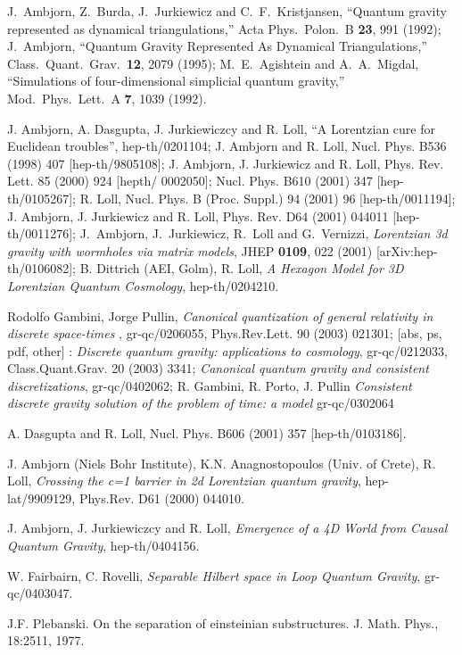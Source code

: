 \documentclass[12pt]{article}
\begin{document}
\begin{thebibliography}{0}
{J.~Ambjorn, Z.~Burda, J.~Jurkiewicz and C.~F.~Kristjansen,
``Quantum gravity represented as dynamical triangulations,''
Acta Phys.\ Polon.\ B {\bf 23}, 991 (1992); J.~Ambjorn,
``Quantum Gravity Represented As Dynamical Triangulations,''
Class.\ Quant.\ Grav.\  {\bf 12}, 2079 (1995);
M.~E.~Agishtein and A.~A.~Migdal,
``Simulations of four-dimensional simplicial quantum gravity,''
Mod.\ Phys.\ Lett.\ A {\bf 7}, 1039 (1992).

J. Ambjorn, A. Dasgupta, J. Jurkiewiczcy and R. Loll,
``A Lorentzian cure for Euclidean troubles'', hep-th/0201104;
J. Ambjorn and R. Loll, Nucl. Phys. B536 (1998) 407 [hep-th/9805108];
J. Ambjorn, J. Jurkiewicz and R. Loll,
Phys. Rev. Lett. 85 (2000) 924 [hepth/ 0002050]; Nucl. Phys. B610 (2001) 347
[hep-th/0105267]; R. Loll, Nucl. Phys. B (Proc. Suppl.) 94
(2001) 96 [hep-th/0011194]; J. Ambjorn, J. Jurkiewicz and R. Loll, Phys.
Rev. D64 (2001) 044011 [hep-th/0011276];
J.~Ambjorn, J.~Jurkiewicz, R.~Loll and G.~Vernizzi,
{\it Lorentzian 3d gravity with wormholes via matrix models},
JHEP {\bf 0109}, 022 (2001)
[arXiv:hep-th/0106082]; 
B. Dittrich (AEI, Golm), R. Loll, {\it  A Hexagon Model for 3D Lorentzian Quantum 
Cosmology}, hep-th/0204210.


Rodolfo Gambini, Jorge Pullin,
{\it   Canonical quantization of general relativity in discrete space-times  }, 
gr-qc/0206055, Phys.Rev.Lett. 90 (2003) 021301; [abs, ps, pdf, other] :
{\it  Discrete quantum gravity: applications to cosmology}, gr-qc/0212033, 
 Class.Quant.Grav. 20 (2003) 3341;  
{\it Canonical quantum gravity and consistent discretizations}, gr-qc/0402062; 
R. Gambini, R. Porto, J. Pullin
{\it Consistent discrete gravity solution of the problem of time: a
model} gr-qc/0302064


A. Dasgupta and R. Loll, Nucl. Phys. B606
(2001) 357 [hep-th/0103186].

J. Ambjorn (Niels Bohr Institute), K.N. Anagnostopoulos (Univ.
of Crete), R. Loll, {\it Crossing the c=1 barrier in 2d Lorentzian quantum
gravity}, hep-lat/9909129, Phys.Rev. D61 (2000) 044010.

J. Ambjorn, J. Jurkiewiczcy and R. Loll, 
{\it Emergence of a 4D World from Causal Quantum Gravity}, 
 hep-th/0404156. 


W.  Fairbairn, C.  Rovelli,
{\it Separable Hilbert space in Loop Quantum Gravity},
gr-qc/0403047. 


J.F. Plebanski. On the separation of einsteinian
substructures. J. Math.
Phys., 18:2511, 1977.

}
\end{thebibliography}
\end{document}
